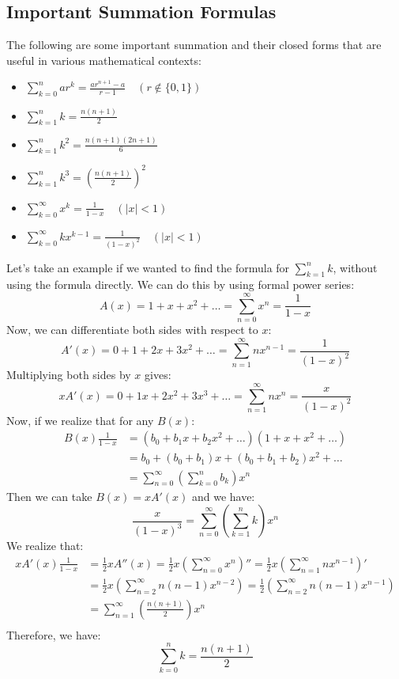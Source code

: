\subsection{Important Summation Formulas}
The following are some important summation and their closed forms that are useful in various mathematical contexts:
\begin{itemize}[itemsep=1pt,label=$\circ$]
    \item $\sum_{k = 0}^{n} ar^k = \frac{ar^{n + 1} - a}{r - 1} \quad (r \notin \{0, 1\})$
    \item $\sum_{k = 1}^{n} k = \frac{n(n + 1)}{2}$
    \item $\sum_{k = 1}^{n} k^2 = \frac{n (n + 1)(2n + 1)}{6}$
    \item $\sum_{k = 1}^{n} k^3 = \left(\frac{n(n + 1)}{2}\right)^2$
    \item $\sum_{k = 0}^{\infty} x^k = \frac{1}{1 - x} \quad (|x| < 1)$
    \item $\sum_{k = 0}^{\infty} kx^{k - 1} = \frac{1}{(1 - x)^2} \quad (|x| < 1)$
\end{itemize}
\begin{eg}
    Let's take an example if we wanted to find the formula for $\sum_{k = 1}^{n} k$, without using the formula directly. We can do this by using formal power series:
    \[
        A(x) = 1 + x + x^2 + \ldots = \sum_{n = 0}^{\infty} x^n = \frac{1}{1 -x}
    \]
    Now, we can differentiate both sides with respect to $x$:
    \[
        A'(x) = 0 + 1 + 2x + 3x^2 + \ldots = \sum_{n = 1}^{\infty} nx^{n - 1} = \frac{1}{(1 - x)^2}
    \]
    Multiplying both sides by $x$ gives:
    \[
        xA'(x) = 0 + 1x + 2x^2 + 3x^3 + \ldots = \sum_{n = 1}^{\infty} nx^n = \frac{x}{(1 - x)^2}
    \]
    Now, if we realize that for any $B(x)$:
    \begin{align*}
        B(x) \frac{1}{1 - x} &= (b_0 + b_1x + b_2 x^2 + \ldots)(1 + x + x^2 + \ldots) \\
        &= b_0 + (b_0 + b_1)x + (b_0 + b_1 + b_2)x^2 + \ldots \\
        &= \sum_{n = 0}^{\infty} \left(\sum_{k = 0}^{n} b_k\right)x^n
    \end{align*}
    Then we can take $B(x) = xA'(x)$ and we have:
    \[
        \frac{x}{(1 - x)^3} = \sum_{n = 0}^{\infty} \left(\sum_{k = 1}^{n} k\right)x^n
    \]
    We realize that:
    \begin{align*}
        xA'(x) \frac{1}{1 - x} &= \frac{1}{2}x A''(x) = \frac{1}{2}x \left( \sum_{n = 0}^{\infty} x^n\right)'' = \frac{1}{2}x \left( \sum_{n = 1}^{\infty} nx^{n-1} \right)' \\
        &= \frac{1}{2}x \left( \sum_{n = 2}^{\infty} n (n - 1) x^{n - 2} \right) = \frac{1}{2} \left( \sum_{n = 2}^{\infty} n (n - 1) x^{n - 1} \right) \\
        &= \sum_{n = 1}^{\infty} \left(\frac{n(n + 1)}{2}\right)x^n \\
    \end{align*}
    Therefore, we have:
    \[
        \sum_{k = 0}^{n} k = \frac{n(n + 1)}{2}
    \]
\end{eg}
